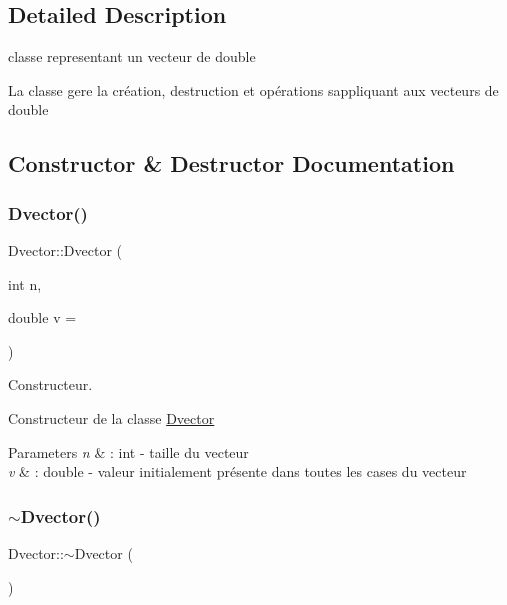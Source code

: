 \subsection{Detailed Description}
classe representant un vecteur de double 

La classe gere la création, destruction et opérations s\textquotesingle{}appliquant aux vecteurs de double 

\subsection{Constructor \& Destructor Documentation}
\hypertarget{class_dvector_a9eda56cb2ca707d915295defb72869c7}{}\label{class_dvector_a9eda56cb2ca707d915295defb72869c7} 
\subsubsection{\texorpdfstring{Dvector()}{Dvector()}\hspace{0.1cm}{\footnotesize\ttfamily [1/3]}}
{\footnotesize\ttfamily Dvector\+::\+Dvector (\begin{DoxyParamCaption}\item[{int}]{n,  }\item[{double}]{v = {} }\end{DoxyParamCaption})}



Constructeur. 

Constructeur de la classe \hyperlink{class_dvector}{Dvector}


\begin{DoxyParams}{Parameters}
{\em n} & \+: int -\/ taille du vecteur \\
\hline
{\em v} & \+: double -\/ valeur initialement présente dans toutes les cases du vecteur \\
\hline
\end{DoxyParams}
\hypertarget{class_dvector_a3156d0776c5da1a15685970200ec6b96}{}\label{class_dvector_a3156d0776c5da1a15685970200ec6b96} 
\subsubsection{\texorpdfstring{$\sim$\+Dvector()}{~Dvector()}}
{\footnotesize\ttfamily Dvector\+::$\sim$\+Dvector (\begin{DoxyParamCaption}{ }\end{DoxyParamCaption})}



